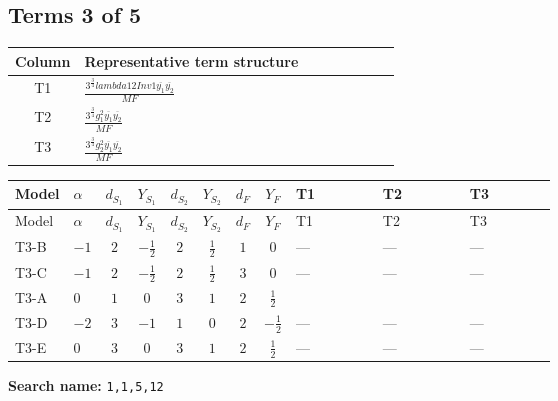 \documentclass[8pt]{article}
\begin{document}
\begin{landscape}
\subsection*{Terms 3 of 5}
\begin{center}
\begin{tabular}{@{}c >{\raggedright\arraybackslash}p{0.82\linewidth}@{}}
\toprule
Column & Representative term structure \\
\midrule
T1 & \(\displaystyle \frac{3^{\frac{3}{4}} lambda12Inv1 \overline{y_{1}} \overline{y_{2}}}{MF}\) \\
\midrule
T2 & \(\displaystyle \frac{3^{\frac{3}{4}} g_{1}^{2} \overline{y_{1}} \overline{y_{2}}}{MF}\) \\
\midrule
T3 & \(\displaystyle \frac{3^{\frac{3}{4}} g_{2}^{2} \overline{y_{1}} \overline{y_{2}}}{MF}\) \\
\midrule
\bottomrule
\end{tabular}
\end{center}
\smallskip
\tiny
\begin{longtable}{@{}llcccccc >{\raggedright\arraybackslash}p{0.21\linewidth} >{\raggedright\arraybackslash}p{0.21\linewidth} >{\raggedright\arraybackslash}p{0.21\linewidth}@{}}
\toprule
Model & $\alpha$ & $d_{S_1}$ & $Y_{S_1}$ & $d_{S_2}$ & $Y_{S_2}$ & $d_F$ & $Y_F$ & T1 & T2 & T3 \\
\midrule
\endfirsthead
\toprule
Model & $\alpha$ & $d_{S_1}$ & $Y_{S_1}$ & $d_{S_2}$ & $Y_{S_2}$ & $d_F$ & $Y_F$ & T1 & T2 & T3 \\
\midrule
\endhead
T3-B & $-1$ & $2$ & $-\frac{1}{2}$ & $2$ & $\frac{1}{2}$ & $1$ & $0$ & --- & --- & --- \\
\midrule
T3-C & $-1$ & $2$ & $-\frac{1}{2}$ & $2$ & $\frac{1}{2}$ & $3$ & $0$ & --- & --- & --- \\
\midrule
T3-A & $0$ & $1$ & $0$ & $3$ & $1$ & $2$ & $\frac{1}{2}$ & \scriptsize\adjustbox{max width=\linewidth}{$\begin{gathered} \frac{3^{\frac{3}{4}} lambda12Inv1 \overline{y_{1}} \overline{y_{2}}}{6 MF}\end{gathered}$} & \scriptsize\adjustbox{max width=\linewidth}{$\begin{gathered} \frac{3^{\frac{3}{4}} g_{1}^{2} \overline{y_{1}} \overline{y_{2}}}{8 MF}\end{gathered}$} & \scriptsize\adjustbox{max width=\linewidth}{$\begin{gathered} \frac{17 \cdot 3^{\frac{3}{4}} g_{2}^{2} \overline{y_{1}} \overline{y_{2}}}{24 MF}\end{gathered}$} \\
\midrule
T3-D & $-2$ & $3$ & $-1$ & $1$ & $0$ & $2$ & $-\frac{1}{2}$ & --- & --- & --- \\
\midrule
T3-E & $0$ & $3$ & $0$ & $3$ & $1$ & $2$ & $\frac{1}{2}$ & --- & --- & --- \\
\midrule
\bottomrule
\end{longtable}
\clearpage
\noindent\textbf{Search name: }\texttt{1,1,5,12}\par\smallskip

\end{landscape}
\end{document}

